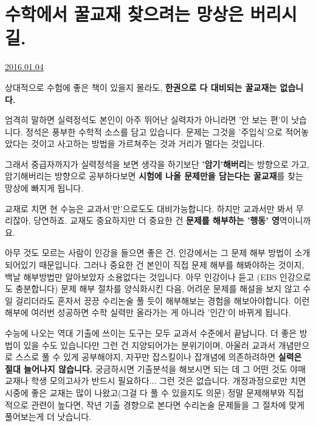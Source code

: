 \section{수학에서 꿀교재 찾으려는 망상은 버리시길.}
\href{https://www.kockoc.com/Apoc/575074}{2016.01.04}

\vspace{5mm}

상대적으로 수험에 좋은 책이 있을지 몰라도, \textbf{한권으로 다 대비되는 꿀교재는 없습니다.}
\vspace{5mm}

엄격히 말하면 실력정석도 본인이 아주 뛰어난 실력자가 아니라면 '안 보는 편'이 낫습니다.
정석은 풍부한 수학적 소스를 담고 있습니다.
문제는 그것을 '주입식'으로 적어놓았다는 것이고 사고하는 방법을 가르쳐주는 것과 거리가 멀다는 것입니다.
\vspace{5mm}

그래서 중급자까지가 실력정석을 보면 생각을 하기보단 \textbf{'암기'해버리}는 방향으로 가고,
암기해버리는 방향으로 공부하다보면 \textbf{시험에 나올 문제만을 담는다는 꿀교재}를 찾는 망상에 빠지게 됩니다.
\vspace{5mm}

교재로 치면 현 수능은 교과서'만'으로도도 대비가능합니다.
하지만 교과서만 봐서 무리잖아,
당연하죠. 교재도 중요하지만 더 중요한 건 \textbf{문제를 해부하는 '행동' 영}역이니까요.
\vspace{5mm}

아무 것도 모르는 사람이 인강을 들으면 좋은 건, 인강에서는 그 문제 해부 방법이 소개되어있기 때문입니다.
그러나 중요한 건 본인이 직접 문제 해부를 해봐야하는 것이지, 백날 해부방법만 알아보았자 소용없다는 것입니다.
아무 인강이나 듣고 (EBS 인강으로도 충분합니다) 문제 해부 절차를 양식화시킨 다음,
어려운 문제를 해설을 보지 않고 수일 걸리더라도 혼자서 끙끙 수리논술 풀 듯이 해부해보는 경험을 해보아야합니다.
이런 해부에 여러번 성공하면 수학 실력만 올라가는 게 아니라 '인간'이 바뀌게 됩니다.
\vspace{5mm}

수능에 나오는 역대 기출에 쓰이는 도구는 모두 교과서 수준에서 끝납니다.
더 좋은 방법이 있을 수도 있습니다만 그런 건 지양되어가는 분위기이며, 아울러 교과서 개념만으로 스스로 풀 수 있게 공부해야지,
자꾸만 잡스킬이나 잡개념에 의존하려하면 \textbf{실력은 절대 늘어나지 않습니다.}
궁금하시면 기출분석을 해보시면 되는 데 그 어떤 것도 야매 교재나 학생 모의고사가 반드시 필요하다... 그런 것은 없습니다.
개정과정으로만 치면 시중에 좋은 교재는 많이 나왔고(그걸 다 풀 수 있을지도 의문)
정말 문제해부와 직접적으로 관련이 높다면, 작년 기출 경향으로 본다면 수리논술 문제들을 그 절차에 맞게 풀어보는게 더 낫습니다.
\vspace{5mm}

